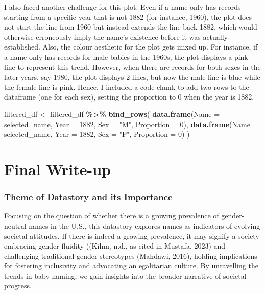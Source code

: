 \documentclass[
]{article}
\newenvironment{Shaded}{\begin{snugshade}}{\end{snugshade}}
\newcommand{\AttributeTok}[1]{\textcolor[rgb]{0.13,0.29,0.53}{#1}}
\newcommand{\DecValTok}[1]{\textcolor[rgb]{0.00,0.00,0.81}{#1}}
\newcommand{\FunctionTok}[1]{\textcolor[rgb]{0.13,0.29,0.53}{\textbf{#1}}}
\newcommand{\NormalTok}[1]{#1}
\newcommand{\OtherTok}[1]{\textcolor[rgb]{0.56,0.35,0.01}{#1}}
\newcommand{\SpecialCharTok}[1]{\textcolor[rgb]{0.81,0.36,0.00}{\textbf{#1}}}
\newcommand{\StringTok}[1]{\textcolor[rgb]{0.31,0.60,0.02}{#1}}
\begin{document}
I also faced another challenge for this plot. Even if a name only has
records starting from a specific year that is not 1882 (for instance,
1960), the plot does not start the line from 1960 but instead extends
the line back 1882, which would otherwise erroneously imply the name's
existence before it was actually established. Also, the colour aesthetic
for the plot gets mixed up. For instance, if a name only has records for
male babies in the 1960s, the plot displays a pink line to represent
this trend. However, when there are records for both sexes in the later
years, say 1980, the plot displays 2 lines, but now the male line is
blue while the female line is pink. Hence, I included a code chunk to
add two rows to the dataframe (one for each sex), setting the proportion
to 0 when the year is 1882.

\begin{Shaded}
\begin{Highlighting}[]
\NormalTok{filtered\_df }\OtherTok{\textless{}{-}}\NormalTok{ filtered\_df }\SpecialCharTok{\%\textgreater{}\%}
   \FunctionTok{bind\_rows}\NormalTok{(}
    \FunctionTok{data.frame}\NormalTok{(}\AttributeTok{Name =}\NormalTok{ selected\_name, }\AttributeTok{Year =} \DecValTok{1882}\NormalTok{, }\AttributeTok{Sex =} \StringTok{"M"}\NormalTok{, }\AttributeTok{Proportion =} \DecValTok{0}\NormalTok{),}
   \FunctionTok{data.frame}\NormalTok{(}\AttributeTok{Name =}\NormalTok{ selected\_name, }\AttributeTok{Year =} \DecValTok{1882}\NormalTok{, }\AttributeTok{Sex =} \StringTok{"F"}\NormalTok{, }\AttributeTok{Proportion =} \DecValTok{0}\NormalTok{)}
\NormalTok{ )}
\end{Highlighting}
\end{Shaded}

\hypertarget{final-write-up}{%
\section{Final Write-up}\label{final-write-up}}

\hypertarget{theme-of-datastory-and-its-importance}{%
\subsubsection{Theme of Datastory and its
Importance}\label{theme-of-datastory-and-its-importance}}

Focusing on the question of whether there is a growing prevalence of
gender-neutral names in the U.S., this datastory explores names as
indicators of evolving societal attitudes. If there is indeed a growing
prevalence, it may signify a society embracing gender fluidity ((Kihm,
n.d., as cited in Mustafa, 2023) and challenging traditional gender
stereotypes (Mahdawi, 2016), holding implications for fostering
inclusivity and advocating an egalitarian culture. By unravelling the
trends in baby naming, we gain insights into the broader narrative of
societal progress.
\end{document}
